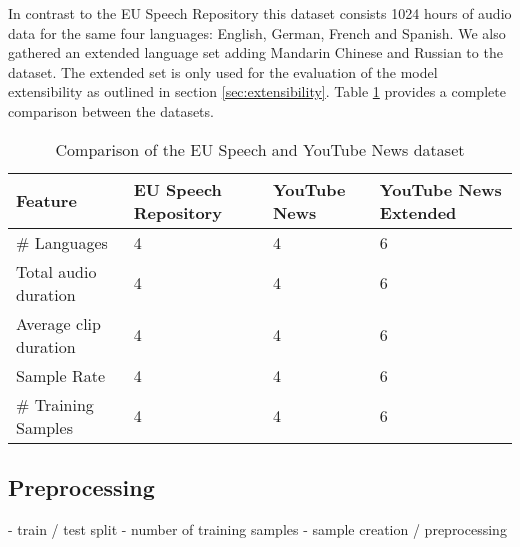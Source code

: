   	In contrast to the EU Speech Repository this dataset consists 1024 hours of audio data for the same four languages: English, German, French and Spanish. We also gathered an extended language set adding Mandarin Chinese and Russian to the dataset. The extended set is only used for the evaluation of the model extensibility as outlined in section \ref{sec:extensibility}. Table \ref{tab:dataset_comparison} provides a complete comparison between the datasets.
  	

	\begin{table}[]
	\centering
	\begin{tabular}{@{}llll@{}}
	\toprule
	Feature               & EU Speech Repository & YouTube News & YouTube News Extended \\ 
	\midrule
	\# Languages   		  & 4                    & 4            & 6                     \\
	Total audio duration  & 4                    & 4            & 6                     \\
	Average clip duration & 4                    & 4            & 6                     \\
	Sample Rate           & 4                    & 4            & 6                     \\ 
	\# Training Samples   & 4                    & 4            & 6                     \\ 
	\bottomrule
	\end{tabular}
	\label{tab:dataset_comparison}
	\caption{Comparison of the EU Speech and YouTube News dataset}
	\end{table}
	
	
\subsection{Preprocessing}

- train / test split
- number of training samples
- sample creation / preprocessing


